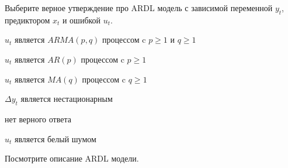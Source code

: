 
\begin{question}
Выберите верное утверждение про ARDL модель с зависимой переменной \(y_t\), предиктором \(x_t\) и ошибкой \(u_t\).
\begin{answerlist}
  \item \(u_t\) является \(ARMA(p, q)\) процессом c \(p \geq 1\) и \(q \geq 1\)
  \item \(u_t\) является \(AR(p)\) процессом c \(p \geq 1\)
  \item \(u_t\) является \(MA(q)\) процессом c \(q \geq 1\)
  \item \(\Delta y_t\) является нестационарным
  \item нет верного ответа
  \item \(u_t\) является белый шумом
\end{answerlist}
\end{question}

\begin{solution}
Посмотрите описание ARDL модели.
\end{solution}

